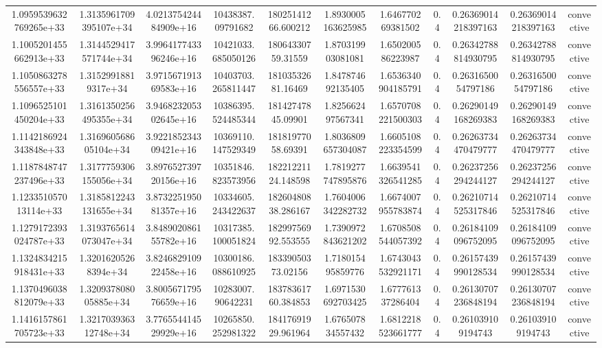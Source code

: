 \begin{table}
\begin{tabular}{ccccccccccc}
1.0959539632769265e+33 & 1.3135961709395107e+34 & 4.021375424484909e+16 & 10438387.09791682 & 18025141266.600212 & 1.8930005163625985 & 1.646770269381502 & 0.4 & 0.26369014218397163 & 0.26369014218397163 & convective \\
1.1005201455662913e+33 & 1.3144529417571744e+34 & 3.996417743396246e+16 & 10421033.685050126 & 18064330759.31559 & 1.870319903081081 & 1.650200586223987 & 0.4 & 0.26342788814930795 & 0.26342788814930795 & convective \\
1.1050863278556557e+33 & 1.31529918819317e+34 & 3.971567191369583e+16 & 10403703.265811447 & 18103532681.16469 & 1.847874692135405 & 1.6536340904185791 & 0.4 & 0.2631650054797186 & 0.2631650054797186 & convective \\
1.1096525101450204e+33 & 1.3161350256495355e+34 & 3.946823205302645e+16 & 10386395.524485344 & 18142747845.09901 & 1.825662497567341 & 1.6570708221500303 & 0.4 & 0.26290149168269383 & 0.26290149168269383 & convective \\
1.1142186924343848e+33 & 1.316960568605104e+34 & 3.922185234309421e+16 & 10369110.147529349 & 18181977058.69391 & 1.8036809657304087 & 1.6605108223354599 & 0.4 & 0.26263734470479777 & 0.26263734470479777 & convective \\
1.1187848747237496e+33 & 1.3177759306155056e+34 & 3.897652739720156e+16 & 10351846.823573956 & 18221221124.148598 & 1.7819277747895876 & 1.6639541326541285 & 0.4 & 0.26237256294244127 & 0.26237256294244127 & convective \\
1.123351057013114e+33 & 1.3185812243131655e+34 & 3.873225195081357e+16 & 10334605.243422637 & 18260480838.286167 & 1.7604006342282732 & 1.6674007955783874 & 0.4 & 0.26210714525317846 & 0.26210714525317846 & convective \\
1.1279172393024787e+33 & 1.3193765614073047e+34 & 3.848902086155782e+16 & 10317385.100051824 & 18299756992.553555 & 1.7390972843621202 & 1.6708508544057392 & 0.4 & 0.26184109096752095 & 0.26184109096752095 & convective \\
1.1324834215918431e+33 & 1.32016205268394e+34 & 3.824682910922458e+16 & 10300186.088610925 & 18339050373.02156 & 1.718015495859776 & 1.6743043532921171 & 0.4 & 0.26157439990128534 & 0.26157439990128534 & convective \\
1.1370496038812079e+33 & 1.320937808005885e+34 & 3.800567179576659e+16 & 10283007.90642231 & 18378361760.384853 & 1.6971530692703425 & 1.677761337286404 & 0.4 & 0.26130707236848194 & 0.26130707236848194 & convective \\
1.1416157861705723e+33 & 1.321703936312748e+34 & 3.776554414529929e+16 & 10265850.252981322 & 18417691929.961964 & 1.676507834557432 & 1.6812218523661777 & 0.4 & 0.261039109194743 & 0.261039109194743 & convective \\

\end{tabular}
\end{table}
